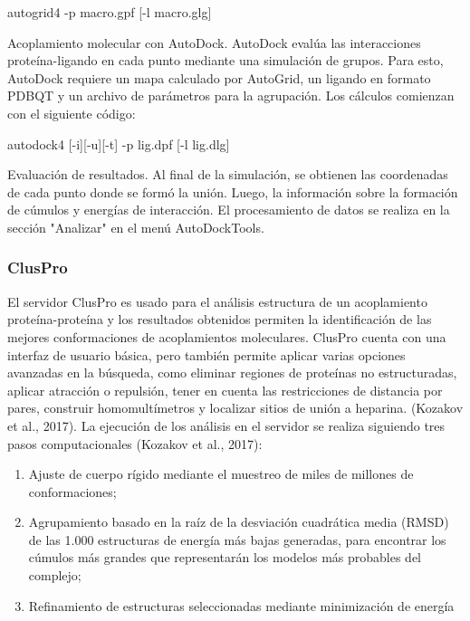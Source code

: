 \documentclass[11pt, letterpaper, spanish]{article}
\begin{document}
{{\vspace{0.4 cm}
    autogrid4 -p macro.gpf [-l macro.glg]
\vspace{0.4 cm}
\par{Acoplamiento molecular con AutoDock. AutoDock evalúa las interacciones proteína-ligando en cada punto mediante una simulación de grupos. Para esto, AutoDock requiere un mapa calculado por AutoGrid, un ligando en formato PDBQT y un archivo de parámetros para la agrupación. Los cálculos comienzan con el siguiente código:}
\vspace{0.4 cm}

autodock4 [-i][-u][-t] -p lig.dpf [-l lig.dlg]

\vspace{0.4 cm}

\par{Evaluación de resultados.
Al final de la simulación, se obtienen las coordenadas de cada punto donde se formó la unión. Luego, la información sobre la formación de cúmulos y energías de interacción. El procesamiento de datos se realiza en la sección "Analizar" en el menú AutoDockTools.}
\newpage

\subsubsection{ClusPro}

\par{El servidor ClusPro es usado para el análisis estructura de un acoplamiento proteína-proteína y los resultados obtenidos permiten la identificación de las mejores conformaciones de acoplamientos moleculares. ClusPro cuenta con una interfaz de usuario básica, pero también permite aplicar varias opciones avanzadas en la búsqueda, como eliminar regiones de proteínas no estructuradas, aplicar atracción o repulsión, tener en cuenta las restricciones de distancia por pares, construir homomultímetros y localizar sitios de unión a heparina. (Kozakov et al., 2017). La ejecución de los análisis en el servidor se realiza siguiendo tres pasos computacionales (Kozakov et al., 2017):} 

\begin{enumerate}
    \item Ajuste de cuerpo rígido mediante el muestreo de miles de millones de conformaciones;
\item Agrupamiento basado en la raíz de la desviación cuadrática media (RMSD) de las 1.000 estructuras de energía más bajas generadas, para encontrar los cúmulos más grandes que representarán los modelos más probables del complejo;
\item Refinamiento de estructuras seleccionadas mediante minimización de energía
\end{enumerate}
}}
\end{document}
